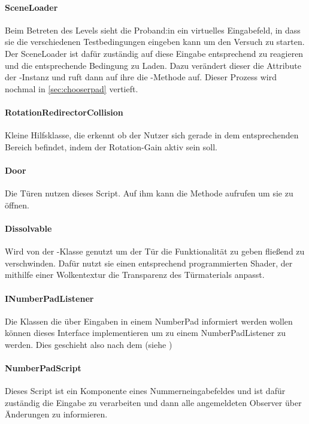 \begin{multicols*}{2}
    \paragraph{SceneLoader}
    Beim Betreten des Levels sieht die Proband:in ein virtuelles Eingabefeld, in dass sie die verschiedenen Testbedingungen eingeben kann um den Versuch zu starten. Der SceneLoader ist dafür zuständig auf diese Eingabe entsprechend zu reagieren und die entsprechende Bedingung zu Laden. Dazu verändert dieser die Attribute der -Instanz und ruft dann auf ihre die -Methode auf. Dieser Prozess wird nochmal in \autoref{sec:chooserpad} vertieft.

    \paragraph{RotationRedirectorCollision}
    Kleine Hilfsklasse, die erkennt ob der Nutzer sich gerade in dem entsprechenden Bereich befindet, indem der Rotation-Gain aktiv sein soll.

    \paragraph{Door}
    Die Türen nutzen dieses Script. Auf ihm kann die Methode  aufrufen um sie zu öffnen.

    \paragraph{Dissolvable}
    Wird von der -Klasse genutzt um der Tür die Funktionalität zu geben fließend zu verschwinden. Dafür nutzt sie einen entsprechend programmierten Shader, der mithilfe einer Wolkentextur die Transparenz des Türmaterials anpasst. %

    \paragraph{INumberPadListener}
    Die Klassen die über Eingaben in einem NumberPad informiert werden wollen können dieses Interface implementieren um zu einem NumberPadListener zu werden. Dies geschieht also nach dem  (siehe \cite{design-patterns})

    \paragraph{NumberPadScript}
    Dieses Script ist ein Komponente eines Nummerneingabefeldes und ist dafür zuständig die Eingabe zu verarbeiten und dann alle angemeldeten Observer über Änderungen zu informieren.


\end{multicols*}
